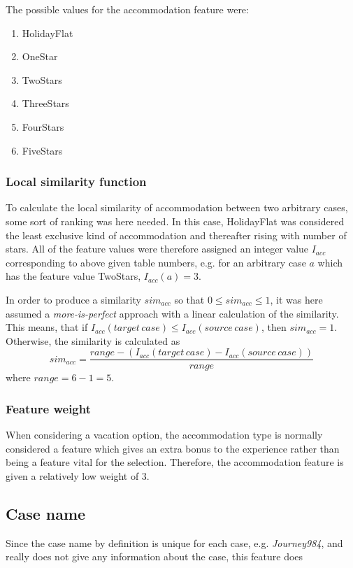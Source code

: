 \documentclass[12pt]{article}
\begin{document}
The possible values for the accommodation feature were: 

\begin{enumerate}
\item HolidayFlat
\item OneStar
\item TwoStars
\item ThreeStars
\item FourStars
\item FiveStars
\end{enumerate}

\subsubsection{Local similarity function}

To calculate the local similarity of accommodation between two arbitrary cases, some sort of ranking was here needed. 
In this case, HolidayFlat was considered the least exclusive kind of accommodation and thereafter rising with number of stars. All of the feature values were therefore assigned an integer value $I_{acc}$ corresponding to above given table numbers, e.g. for an arbitrary case $a$ which has the feature value TwoStars, $I_{acc}(a)=3$. 

In order to produce a similarity $sim_{acc}$ so that $0 \leq sim_{acc} \leq 1$, it was here assumed a \textit{more-is-perfect} approach with a linear calculation of the similarity. This means, that if $I_{acc}(target\,case) \leq I_{acc}(source\,case)$, then $sim_{acc}=1$. Otherwise, the similarity is calculated as $$sim_{acc}=\frac{range-(I_{acc}(target\,case)-I_{acc}(source\,case))}{range}$$
where $range=6-1=5$.

\subsubsection{Feature weight}

When considering a vacation option, the accommodation type is normally considered a feature which gives an extra bonus to the experience rather than being a feature vital for the selection. Therefore, the accommodation feature is given a relatively low weight of 3. 

\subsection{Case name}

Since the case name by definition is unique for each case, e.g. \textit{Journey984}, and really does not give any information about the case, this feature does
\end{document}
